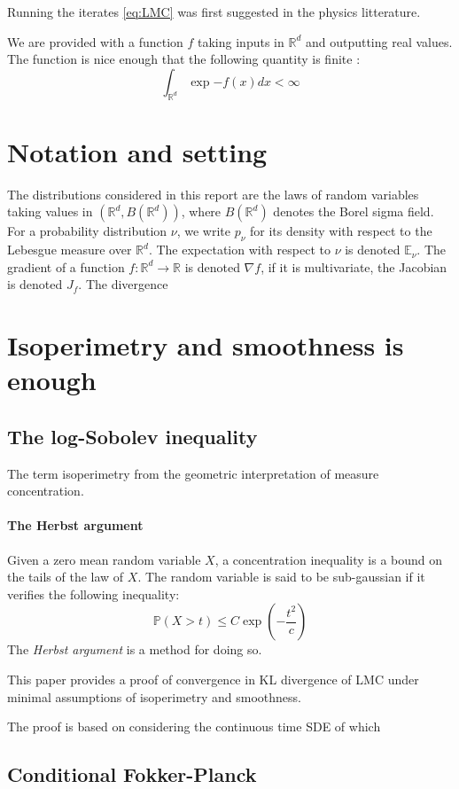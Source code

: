 \documentclass[11pt,twoside]{article}
\newcommand{\Prb}{\mathbb{P}}
\newcommand{\E}{\mathbb{E}}
\newcommand{\R}{\mathbb{R}}
\begin{document}
Running the iterates \eqref{eq:LMC} was first suggested in the physics litterature. 

We are provided with a function $f$ taking inputs in $\R^d$ and outputting real values. The function is nice enough that the following quantity is finite :
\[
\int_{\R^d}\exp{-f(x)}dx < \infty
\]

\section{Notation and setting}

The distributions considered in this report are the laws of random variables taking values in $(\R^d, B(\R^d))$, where $B(\R^d)$ denotes the Borel sigma field. For a probability distribution $\nu$, we write $p_\nu$ for its density with respect to the Lebesgue measure over $\R^d$. The expectation with respect to $\nu$ is denoted $\E_\nu$. The gradient of a function $f: \R^d \rightarrow \R$ is denoted $\nabla f$, if it is multivariate, the Jacobian is denoted $J_f$. The divergence 

\section{Isoperimetry and smoothness is enough}

\subsection{The log-Sobolev inequality}
The term isoperimetry from the geometric interpretation of measure concentration. 

\paragraph{The Herbst argument} Given a zero mean random variable $X$, a concentration inequality is a bound on the tails of the law of $X$. The random variable is said to be sub-gaussian if it verifies the following inequality:
\[
\Prb(X > t) \leq C\exp(-\frac{t^2}{c})
\]
The \textit{Herbst argument} is a method for doing so.


This paper provides a proof of convergence in KL divergence of LMC under minimal assumptions of isoperimetry and smoothness.

The proof is based on considering the continuous time SDE of which 

\subsection{Conditional Fokker-Planck}
\end{document}
